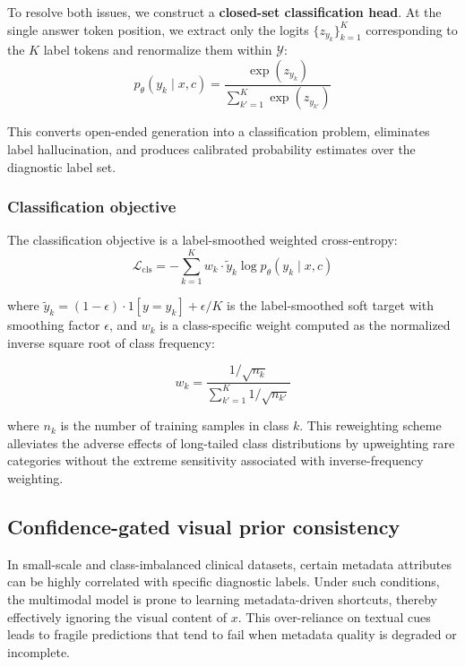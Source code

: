 \documentclass[preprint,12pt]{elsarticle}
\makeatletter
\def@NAT@last@yr{--\NAT@penalty}%
\makeatother
\begin{document}
To resolve both issues, we construct a \textbf{closed-set classification head}. At the single answer token position, we extract only the logits $\{z_{y_k}\}_{k=1}^{K}$ corresponding to the $K$ label tokens and renormalize them within $\mathcal{Y}$:
%
\begin{equation}
p_\theta(y_k \mid x, c) = \frac{\exp(z_{y_k})}{\sum_{k'=1}^{K} \exp(z_{y_{k'}})} 
\end{equation}

This converts open-ended generation into a classification problem, eliminates label hallucination, and produces calibrated probability estimates over the diagnostic label set.

\subsubsection{Classification objective}
The classification objective is a label-smoothed weighted cross-entropy:
%
\begin{equation}
	\mathcal{L}_{\mathrm{cls}} 
	= -\sum_{k=1}^{K} w_k \cdot \tilde{y}_k \log p_\theta(y_k \mid x,c)
	\label{eq:cls_loss}
\end{equation}

where \(\tilde{y}_k = (1 - \epsilon) \cdot 1[y = y_k] + \epsilon / K\) is the label-smoothed soft target with smoothing factor \(\epsilon\), and \(w_k\) is a class-specific weight computed as the normalized inverse square root of class frequency:

\begin{equation}
	w_k = \frac{1 / \sqrt{n_k}}{\sum_{k'=1}^K 1 / \sqrt{n_{k'}}} 
\end{equation}

where \(n_k\) is the number of training samples in class \(k\). This reweighting scheme alleviates the adverse effects of long-tailed class distributions by upweighting rare categories without the extreme sensitivity associated with inverse-frequency weighting.


\subsection{Confidence-gated visual prior consistency}
In small-scale and class-imbalanced clinical datasets, certain metadata attributes can be highly correlated with specific diagnostic labels. Under such conditions, the multimodal model is prone to learning metadata-driven shortcuts, thereby effectively ignoring the visual content of $x$. This over-reliance on textual cues leads to fragile predictions that tend to fail when metadata quality is degraded or incomplete.
\end{document}
